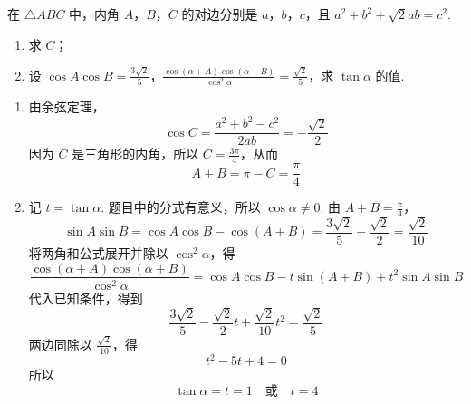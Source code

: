 \begin{problem}
在 \(\triangle ABC\) 中，内角 \(A\)，\(B\)，\(C\) 的对边分别是 \(a\)，\(b\)，\(c\)，且 \(a^2 + b^2 + \sqrt{2}ab = c^2\).
\begin{enumerate}
\item 求 \(C\)；
\item 设 \(\cos A\cos B = \frac{3\sqrt{2}}{5}\)，\(\frac{\cos(\alpha + A)\cos(\alpha + B)}{\cos^2\alpha} = \frac{\sqrt{2}}{5}\)，求 \(\tan \alpha\) 的值.
\end{enumerate}

\begin{solution}
\begin{enumerate}
\item 由余弦定理，
\[
\cos C=\frac{a^2+b^2-c^2}{2ab}=-\frac{\sqrt{2}}{2}
\]
因为 \(C\) 是三角形的内角，所以 \(C=\frac{3\pi}{4}\)，从而
\[
A+B=\pi-C=\frac{\pi}{4}
\]

\item 记 \(t=\tan\alpha\). 题目中的分式有意义，所以 \(\cos\alpha\ne0\). 由 \(A+B=\frac{\pi}{4}\)，
\[
\sin A\sin B=\cos A\cos B-\cos(A+B)=\frac{3\sqrt{2}}{5}-\frac{\sqrt{2}}{2}=\frac{\sqrt{2}}{10}
\]
将两角和公式展开并除以 \(\cos^2\alpha\)，得
\[
\frac{\cos(\alpha+A)\cos(\alpha+B)}{\cos^2\alpha}
=\cos A\cos B-t\sin(A+B)+t^2\sin A\sin B
\]
代入已知条件，得到
\[
\frac{3\sqrt{2}}{5}-\frac{\sqrt{2}}{2}t+\frac{\sqrt{2}}{10}t^2=\frac{\sqrt{2}}{5}
\]
两边同除以 \(\frac{\sqrt{2}}{10}\)，得
\[
t^2-5t+4=0
\]
所以
\[
\tan\alpha=t=1\quad\text{或}\quad t=4
\]
\end{enumerate}
\end{solution}

\end{problem}

